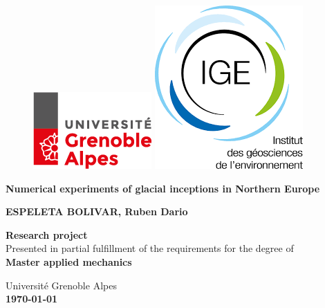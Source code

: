 \documentclass[a4paper,12pt]{article}
\begin{document}
\begin{center}
	
	\begin{figure} [t]
		\includegraphics[width=0.3\linewidth]{../fig/logo_UGA.png}
		\hspace{5.0cm}
		\includegraphics[width=0.3\linewidth]{../fig/logo_IGE.png}
		\vspace{2.0cm}
	\end{figure}
	
	\begin{Large}
		\textbf{Numerical experiments of glacial inceptions in Northern Europe}
	\end{Large}
	
	\vspace{0.4cm}
	
	\textbf{ESPELETA BOLIVAR, Ruben Dario}
	
	\vspace{3.0cm}
	
	
	\textbf{Research project}\\
	Presented in partial fulfillment of the requirements for the degree of\\
	\textbf{Master applied mechanics}\\
	
	
	\vspace{3.0cm}
	
	Université Grenoble Alpes\\
	\textbf{\today}
	\vspace{4.0cm}
	
\end{center}

\renewcommand{\labelitemi}{$\bullet$}
\end{document}

